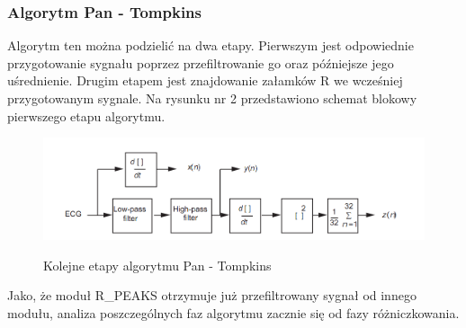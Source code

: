 \subsubsection{Algorytm Pan - Tompkins}

Algorytm ten można podzielić na dwa etapy. Pierwszym jest odpowiednie przygotowanie sygnału poprzez przefiltrowanie go oraz późniejsze jego uśrednienie. Drugim etapem jest znajdowanie załamków R we wcześniej przygotowanym sygnale. Na rysunku nr 2 przedstawiono schemat blokowy pierwszego etapu algorytmu.
\begin{figure}[H]
\centering
\includegraphics[scale=0.4]{R_PEAKS/img/pan_tompkins_alg}
\label{fig:RP_PTA}
\caption{Kolejne etapy algorytmu Pan - Tompkins}
\end{figure}
Jako, że moduł R\_PEAKS otrzymuje już przefiltrowany sygnał od innego modułu, analiza poszczególnych faz algorytmu zacznie się od fazy różniczkowania.
